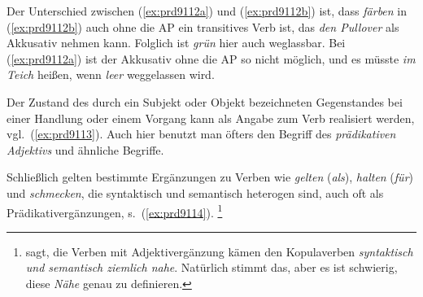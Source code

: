 \begin{exe}
  \ex\label{ex:prd9112}
  \begin{xlist}
  \end{xlist}
\end{exe}

Der Unterschied zwischen (\ref{ex:prd9112a}) und (\ref{ex:prd9112b}) ist, dass \textit{färben} in (\ref{ex:prd9112b}) auch ohne die AP ein transitives Verb ist, das \textit{den Pullover} als Akkusativ nehmen kann.
Folglich ist \textit{grün} hier auch weglassbar.
Bei (\ref{ex:prd9112a}) ist der Akkusativ ohne die AP so nicht möglich, und es müsste \textit{im Teich} heißen, wenn \textit{leer} weggelassen wird.

Der Zustand des durch ein Subjekt oder Objekt bezeichneten Gegenstandes bei einer Handlung oder einem Vorgang kann als Angabe zum Verb realisiert werden, vgl.\ (\ref{ex:prd9113}).
Auch hier benutzt man öfters den Begriff des \textit{prädikativen Adjektivs} und ähnliche Begriffe.

\begin{exe}
\end{exe}

Schließlich gelten bestimmte Ergänzungen zu Verben wie \textit{gelten} (\textit{als}), \textit{halten} (\textit{für}) und \textit{schmecken}, die syntaktisch und semantisch heterogen sind, auch oft als Prädikativergänzungen, s.\ (\ref{ex:prd9114}).%
\footnote{\citet[80]{Eisenberg2} sagt, die Verben mit Adjektivergänzung kämen den Kopulaverben \textit{syntaktisch und semantisch ziemlich nahe}.
Natürlich stimmt das, aber es ist schwierig, diese \textit{Nähe} genau zu definieren.}

\begin{exe}
  \ex\label{ex:prd9114} 
  \begin{xlist}
  \end{xlist}
\end{exe}

